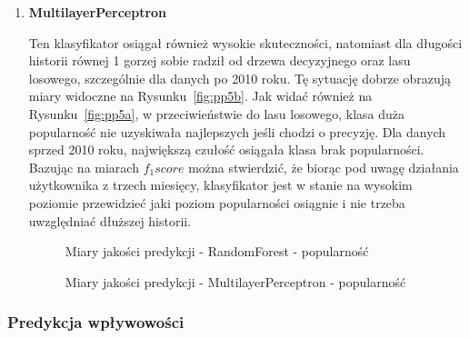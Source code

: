 \documentclass[polish,12pt]{aghthesis}
\begin{document}
\begin{enumerate}
    \item \textbf{MultilayerPerceptron}
    
    Ten klasyfikator osiągał również wysokie skuteczności, natomiast dla długości historii równej 1 gorzej sobie radził od drzewa decyzyjnego oraz lasu losowego, szczególnie dla danych po 2010 roku. Tę sytuację dobrze obrazują miary widoczne na Rysunku~\ref{fig:pp5b}. Jak widać również na Rysunku~\ref{fig:pp5a}, w przeciwieństwie do lasu losowego, klasa duża popularność nie uzyskiwała najlepszych jeśli chodzi o precyzję. Dla danych sprzed 2010 roku, największą czułość osiągała klasa brak popularności. Bazując na miarach \textit{$f_1 score$} można stwierdzić, że biorąc pod uwagę działania użytkownika z trzech miesięcy, klasyfikator jest w stanie na wysokim poziomie przewidzieć jaki poziom popularności osiągnie i nie trzeba uwzględniać dłuższej historii.

    
        \begin{figure}[ht] 
    \centering
    \hfill%
    \caption{Miary jakości predykcji - RandomForest - popularność}
    \label{p:p4}
    \end{figure}
    \FloatBarrier
    
    
         \begin{figure}[ht] 
    \centering
    \hfill%
    \label{p:p5}
    \caption{Miary jakości predykcji - MultilayerPerceptron - popularność}
\end{figure}

\FloatBarrier

\end{enumerate}


\subsubsection{Predykcja wpływowości}
\end{document}
